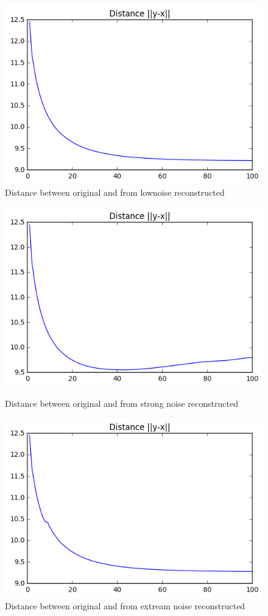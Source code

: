 \documentclass[a4paper,11pt]{article}
\begin{document}
\begin{figure}[htbp]
  \includegraphics[scale=0.7]{dlown.png}
  \caption{Distance between original and from lownoise reconstructed}
   \end{figure}
\begin{figure}[htbp]
  \includegraphics[scale=0.7]{dh.png}
  \caption{Distance between original and from strong noise reconstructed}
  \includegraphics[scale=0.7]{de.png}
  \caption{Distance between original and from extream noise reconstructed}
\end{figure}
\end{document}
